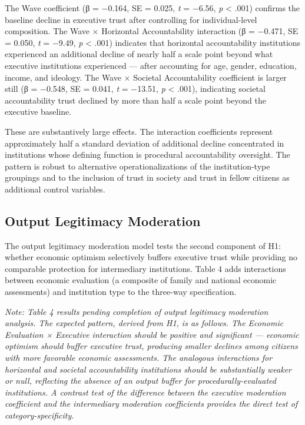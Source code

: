 \documentclass[
  12pt,
  letterpaper]{article}
\begin{document}
The Wave coefficient (β = −0.164, SE = 0.025, \emph{t} = −6.56, \emph{p}
\textless{} .001) confirms the baseline decline in executive trust after
controlling for individual-level composition. The Wave × Horizontal
Accountability interaction (β = −0.471, SE = 0.050, \emph{t} = −9.49,
\emph{p} \textless{} .001) indicates that horizontal accountability
institutions experienced an additional decline of nearly half a scale
point beyond what executive institutions experienced --- after
accounting for age, gender, education, income, and ideology. The Wave ×
Societal Accountability coefficient is larger still (β = −0.548, SE =
0.041, \emph{t} = −13.51, \emph{p} \textless{} .001), indicating
societal accountability trust declined by more than half a scale point
beyond the executive baseline.

These are substantively large effects. The interaction coefficients
represent approximately half a standard deviation of additional decline
concentrated in institutions whose defining function is procedural
accountability oversight. The pattern is robust to alternative
operationalizations of the institution-type groupings and to the
inclusion of trust in society and trust in fellow citizens as additional
control variables.

\subsection{Output Legitimacy
Moderation}\label{output-legitimacy-moderation}

The output legitimacy moderation model tests the second component of H1:
whether economic optimism selectively buffers executive trust while
providing no comparable protection for intermediary institutions. Table
4 adds interactions between economic evaluation (a composite of family
and national economic assessments) and institution type to the three-way
specification.

\emph{Note: Table 4 results pending completion of output legitimacy
moderation analysis. The expected pattern, derived from H1, is as
follows. The Economic Evaluation × Executive interaction should be
positive and significant --- economic optimism should buffer executive
trust, producing smaller declines among citizens with more favorable
economic assessments. The analogous interactions for horizontal and
societal accountability institutions should be substantially weaker or
null, reflecting the absence of an output buffer for
procedurally-evaluated institutions. A contrast test of the difference
between the executive moderation coefficient and the intermediary
moderation coefficients provides the direct test of
category-specificity.}
\end{document}
